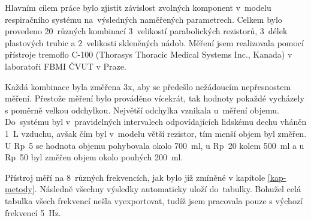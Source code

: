 
Hlavním cílem práce bylo zjistit závislost zvolných komponent v~modelu respiračního systému na~výsledných naměřených parametrech.  Celkem bylo provedeno 20~různých kombinací 3~velikostí parabolických rezistorů, 3~délek plastových trubic a 2~velikosti skleněných nádob. Měření jsem realizovala pomocí přístroje tremoflo C-100 (Thorasys Thoracic Medical Systems Inc., Kanada) v laboratoři FBMI ČVUT v Praze. 

Každá kombinace byla změřena 3x, aby se předešlo nežádoucím nepřesnostem měření. Přestože měření bylo prováděno vícekrát, tak hodnoty pokaždé vycházely s poměrně velkou odchylkou. Největší odchylka vznikala u~měření objemu. 
Do~systému byl v~pravidelných intervalech odpovídajících lidskému dechu vháněn \SI{1}{L} vzduchu, avšak čím byl v~modelu větší rezistor,  tím menší objem byl změřen. U Rp~5 se hodnota objemu pohybovala okolo  \SI{700}{ml}, u Rp~20 kolem  \SI{500}{ml} a u Rp~50 byl změřen objem okolo pouhých \SI{200}{ml}.

Přístroj měří na 8~různých frekvencích, jak bylo již zmíněné v kapitole \ref{kap-metody}. Následně všechny výsledky automaticky uloží do~tabulky. 
Bohužel celá tabulka všech frekvencí nešla vyexportovat, tudíž jsem pracovala pouze s výchozí frekvencí  \SI{5}{Hz}. 



